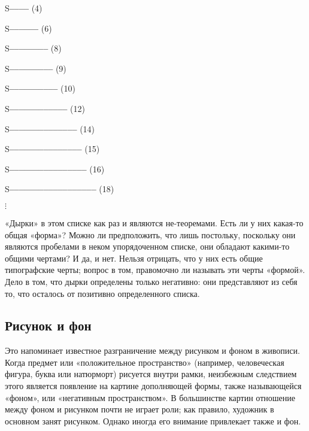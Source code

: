\documentclass[../main.tex]{subfiles}
\begin{document}
\begin{center}
\begin{minipage}{0.4\textwidth}
    S\textbf{--{}--{}--{}--} (4)

    S\textbf{--{}--{}--{}--{}--{}--} (6)

    S\textbf{--{}--{}--{}--{}--{}--{}--{}--} (8)

    S\textbf{--{}--{}--{}--{}--{}--{}--{}--{}--} (9)

    S\textbf{--{}--{}--{}--{}--{}--{}--{}--{}--{}--} (10)

    S\textbf{--{}--{}--{}--{}--{}--{}--{}--{}--{}--{}--{}--} (12)

    S\textbf{--{}--{}--{}--{}--{}--{}--{}--{}--{}--{}--{}--{}--{}--} (14)

    S\textbf{--{}--{}--{}--{}--{}--{}--{}--{}--{}--{}--{}--{}--{}--{}--} (15)

    S\textbf{--{}--{}--{}--{}--{}--{}--{}--{}--{}--{}--{}--{}--{}--{}--{}--} (16)

    S\textbf{--{}--{}--{}--{}--{}--{}--{}--{}--{}--{}--{}--{}--{}--{}--{}--{}--{}--} (18)
\end{minipage}

$\vdots$
\end{center}

«Дырки» в этом списке как раз и являются не-теоремами. Есть ли у них какая-то общая «форма»? Можно ли предположить, что лишь постольку, поскольку они являются пробелами в неком упорядоченном списке, они обладают какими-то общими чертами? И да, и нет. Нельзя отрицать, что у них есть общие типографские черты; вопрос в том, правомочно ли называть эти черты «формой». Дело в том, что дырки определены только негативно: они представляют из себя то, что осталось от позитивно определенного списка.


\subsection{Рисунок и фон}

Это напоминает известное разграничение между рисунком и фоном в живописи.
Когда предмет или «положительное пространство» (например, человеческая фигура, буква или натюрморт) рисуется внутри рамки, неизбежным следствием этого является появление на картине дополняющей формы, также называющейся «фоном», или «негативным пространством».
В большинстве картин отношение между фоном и рисунком почти не играет роли; как правило, художник в основном занят рисунком.
Однако иногда его внимание привлекает также и фон.
\end{document}
